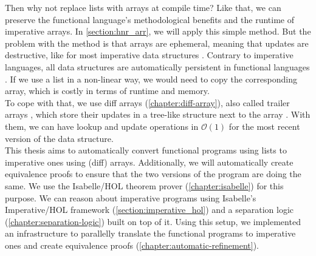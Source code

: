 \noindent Then why not replace lists with arrays at compile time? Like that, we can preserve the functional language's methodological benefits and the runtime of imperative arrays. In \autoref{section:hnr_arr}, we will apply this simple method. But the problem with the method is that arrays are ephemeral, meaning that updates are destructive, like for most imperative data structures \parencite[p.2]{Okasaki_1998}. Contrary to imperative languages, all data structures are automatically persistent in functional languages \parencite[p.2]{Okasaki_1998}.
If we use a list in a non-linear way, we would need to copy the corresponding array, which is costly in terms of runtime and memory. \\
To cope with that, we use diff arrays (\autoref{chapter:diff-array}), also called trailer arrays \parencite{Bloss1989}, which store their updates in a tree-like structure next to the array \parencite[p.706]{Kumar2017}. 
With them, we can have lookup and update operations in $\mathcal{O}(1)$ for the most recent version of the data structure. \\
This thesis aims to automatically convert functional programs using lists to imperative ones using (diff) arrays. Additionally, we will automatically create equivalence proofs to ensure that the two versions of the program are doing the same. We use the Isabelle/HOL theorem prover (\autoref{chapter:isabelle}) for this purpose. We can reason about imperative programs using Isabelle's Imperative/HOL framework (\autoref{section:imperative_hol}) and a separation logic (\autoref{chapter:separation-logic}) built on top of it. Using this setup, we implemented an infrastructure to parallelly translate the functional programs to imperative ones and create equivalence proofs (\autoref{chapter:automatic-refinement}).
